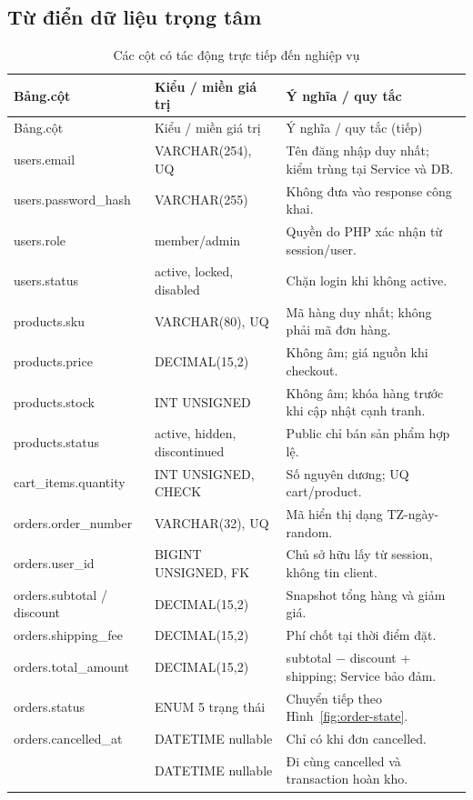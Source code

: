 \subsection{Từ điển dữ liệu trọng tâm}
\begin{longtable}{@{}P{4.4cm}P{3.2cm}P{6.9cm}@{}}
\caption{Các cột có tác động trực tiếp đến nghiệp vụ}\label{tab:dictionary}\\
\toprule Bảng.cột & Kiểu / miền giá trị & Ý nghĩa / quy tắc\\\midrule\endfirsthead
\toprule Bảng.cột & Kiểu / miền giá trị & Ý nghĩa / quy tắc (tiếp)\\\midrule\endhead
users.email & VARCHAR(254), UQ & Tên đăng nhập duy nhất; kiểm trùng tại Service và DB.\\
users.password\_hash & VARCHAR(255) & Không đưa vào response công khai.\\
users.role & member/admin & Quyền do PHP xác nhận từ session/user.\\
users.status & active, locked, disabled & Chặn login khi không active.\\
products.sku & VARCHAR(80), UQ & Mã hàng duy nhất; không phải mã đơn hàng.\\
products.price & DECIMAL(15,2) & Không âm; giá nguồn khi checkout.\\
products.stock & INT UNSIGNED & Không âm; khóa hàng trước khi cập nhật cạnh tranh.\\
products.status & active, hidden, discontinued & Public chỉ bán sản phẩm hợp lệ.\\
cart\_items.quantity & INT UNSIGNED, CHECK & Số nguyên dương; UQ cart/product.\\
orders.order\_number & VARCHAR(32), UQ & Mã hiển thị dạng TZ-ngày-random.\\
orders.user\_id & BIGINT UNSIGNED, FK & Chủ sở hữu lấy từ session, không tin client.\\
orders.subtotal / discount & DECIMAL(15,2) & Snapshot tổng hàng và giảm giá.\\
orders.shipping\_fee & DECIMAL(15,2) & Phí chốt tại thời điểm đặt.\\
orders.total\_amount & DECIMAL(15,2) & subtotal − discount + shipping; Service bảo đảm.\\
orders.status & ENUM 5 trạng thái & Chuyển tiếp theo Hình~\ref{fig:order-state}.\\
orders.cancelled\_at & DATETIME nullable & Chỉ có khi đơn cancelled.\\
 & DATETIME nullable & Đi cùng cancelled và transaction hoàn kho.\\

\end{longtable}

